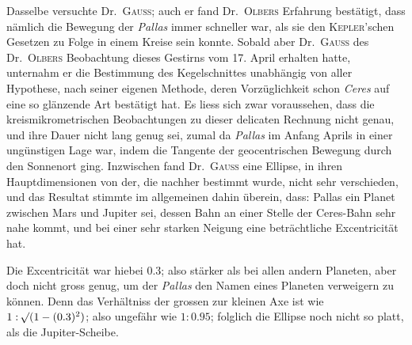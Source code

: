 Dasselbe versuchte Dr.\ \textsc{Gauss}; auch er fand Dr.\ \textsc{Olbers} Erfahrung bestätigt, dass nämlich die Bewegung der \textit{Pallas} immer schneller war, als sie den \textsc{Kepler}'schen Gesetzen zu Folge in einem Kreise sein konnte. Sobald aber Dr.\ \textsc{Gauss} des Dr.\ \textsc{Olbers} Beobachtung dieses Gestirns vom 17. April erhalten hatte, unternahm er die Bestimmung des Kegelschnittes unabhängig von aller Hypothese, nach seiner eigenen Methode, deren Vorzüglichkeit schon \textit{Ceres} auf eine so glänzende Art bestätigt hat. Es liess sich zwar voraussehen, dass die kreismikrometrischen Beobachtungen zu dieser delicaten Rechnung nicht genau, und ihre Dauer nicht lang genug sei, zumal da \textit{Pallas} im Anfang Aprils in einer ungünstigen Lage war, indem die Tangente der geocentrischen Bewegung durch den Sonnenort ging. Inzwischen fand Dr.\ \textsc{Gauss} eine Ellipse, in ihren Hauptdimensionen von der, die nachher bestimmt wurde, nicht sehr verschieden, und das Resultat stimmte im allgemeinen dahin überein, dass: Pallas ein Planet zwischen Mars und Jupiter sei, dessen Bahn an einer Stelle der Ceres-Bahn sehr nahe kommt, und bei einer sehr starken Neigung eine beträchtliche Excentricität hat.

Die Excentricität war hiebei $0.3$; also stärker als bei allen andern Planeten, aber doch nicht gross genug, um der \textit{Pallas} den Namen eines Planeten verweigern zu können. Denn das Verhältniss der grossen zur kleinen Axe ist wie $1:\mathord{{}^{}\!\surd}(1-(0.3)^2)$; also ungefähr wie $1:0.95$; folglich die Ellipse noch nicht so platt, als die Jupiter-Scheibe.

